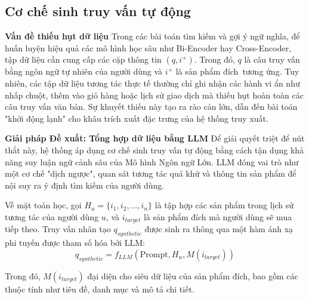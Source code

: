 \subsection{Cơ chế sinh truy vấn tự động}

\noindent \textbf{Vấn đề thiếu hụt dữ liệu}
Trong các bài toán tìm kiếm và gợi ý ngữ nghĩa, để huấn luyện hiệu quả các mô hình học sâu như Bi-Encoder hay Cross-Encoder, tập dữ liệu cần cung cấp các cặp thông tin $(q, i^+)$. Trong đó, $q$ là câu truy vấn bằng ngôn ngữ tự nhiên của người dùng và $i^+$ là sản phẩm đích\ tương ứng. Tuy nhiên, các tập dữ liệu tương tác thực tế thường chỉ ghi nhận các hành vi ẩn như nhấp chuột, thêm vào giỏ hàng hoặc lịch sử giao dịch mà thiếu hụt hoàn toàn các câu truy vấn văn bản. Sự khuyết thiếu này tạo ra rào cản lớn, dẫn đến bài toán "khởi động lạnh" cho khâu trích xuất đặc trưng của hệ thống truy xuất.

\noindent \textbf{Giải pháp Đề xuất: Tổng hợp dữ liệu bằng LLM}
Để giải quyết triệt để nút thắt này, hệ thống áp dụng cơ chế sinh truy vấn tự động bằng cách tận dụng khả năng suy luận ngữ cảnh sâu của Mô hình Ngôn ngữ Lớn. LLM đóng vai trò như một cơ chế "dịch ngược", quan sát tương tác quá khứ và thông tin sản phẩm để nội suy ra ý định tìm kiếm của người dùng.

Về mặt toán học, gọi $H_u = \{i_1, i_2, \dots, i_n\}$ là tập hợp các sản phẩm trong lịch sử tương tác của người dùng $u$, và $i_{target}$ là sản phẩm đích mà người dùng sẽ mua tiếp theo. Truy vấn nhân tạo $q_{synthetic}$ được sinh ra thông qua một hàm ánh xạ phi tuyến được tham số hóa bởi LLM:
$$q_{synthetic} = f_{LLM}\left( \text{Prompt}, H_u, M(i_{target}) \right)$$

Trong đó, $M(i_{target})$ đại diện cho siêu dữ liệu của sản phẩm đích, bao gồm các thuộc tính như tiêu đề, danh mục và mô tả chi tiết.

